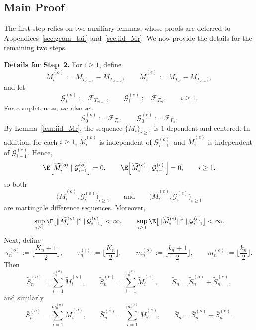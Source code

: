 \documentclass[mnsc,nonblindrev]{informs3}
\begin{document}
\subsection{Main Proof}\label{sec:proof-covariance-mismatch}

The first step relies on two auxiliary lemmas, whose proofs are deferred to
Appendices~\ref{sec:geom_tail} and~\ref{sec:iid_Mr}. We now provide the details
for the remaining two steps.

\medskip
\noindent\textbf{Details for Step~2.}
For \(i \ge 1\), define
\[
\widetilde M_i^{(o)} := M_{T_{2i-1}} - M_{T_{2i-2}},
\qquad
\widetilde M_i^{(e)} := M_{T_{2i}} - M_{T_{2i-1}},
\]
and let
\[
\mathcal G_i^{(o)} := \mathcal F_{T_{2i-1}},
\qquad
\mathcal G_i^{(e)} := \mathcal F_{T_{2i}},
\qquad i \ge 1.
\]
For completeness, we also set
\[
\mathcal G_0^{(o)} := \mathcal F_{T_0},
\qquad
\mathcal G_0^{(e)} := \mathcal F_{T_0}.
\]
By Lemma~\ref{lem:iid_Mr}, the sequence \(\{\widetilde M_i\}_{i\ge1}\) is
\(1\)-dependent and centered. In addition, for each \(i\ge1\),
\(\widetilde M_i^{(o)}\) is independent of \(\mathcal G_{i-1}^{(o)}\), and
\(\widetilde M_i^{(e)}\) is independent of \(\mathcal G_{i-1}^{(e)}\). Hence,
\[
\E\!\left[\widetilde M_i^{(o)} \mid \mathcal G_{i-1}^{(o)}\right]=0,
\qquad
\E\!\left[\widetilde M_i^{(e)} \mid \mathcal G_{i-1}^{(e)}\right]=0,
\qquad i\ge1,
\]
so both
\[
\bigl(\widetilde M_i^{(o)}, \mathcal G_i^{(o)}\bigr)_{i\ge1}
\qquad\text{and}\qquad
\bigl(\widetilde M_i^{(e)}, \mathcal G_i^{(e)}\bigr)_{i\ge1}
\]
are martingale difference sequences. Moreover,
\begin{equation}\label{eq:uniformconditional}
\sup_{i\ge1}\E\bigl[\|\widetilde M_i^{(o)}\|^p \mid \mathcal G_{i-1}^{(o)}\bigr]
< \infty,
\qquad
\sup_{i\ge1}\E\bigl[\|\widetilde M_i^{(e)}\|^p \mid \mathcal G_{i-1}^{(e)}\bigr]
< \infty.
\end{equation}
Next, define
\[
\tau_n^{(o)} := \Big\lfloor \frac{K_n+1}{2} \Big\rfloor,
\qquad
\tau_n^{(e)} := \Big\lfloor \frac{K_n}{2} \Big\rfloor,
\qquad
m_n^{(o)} := \Big\lfloor \frac{k_n+1}{2} \Big\rfloor,
\qquad
m_n^{(e)} := \Big\lfloor \frac{k_n}{2} \Big\rfloor.
\]
Then
\[
\widetilde S_n^{(o)} = \sum_{i=1}^{\tau_n^{(o)}} \widetilde M_i^{(o)},
\qquad
\widetilde S_n^{(e)} = \sum_{i=1}^{\tau_n^{(e)}} \widetilde M_i^{(e)},
\qquad
\widetilde S_n = \widetilde S_n^{(o)} + \widetilde S_n^{(e)},
\]
and similarly
\[
\bar S_n^{(o)} = \sum_{i=1}^{m_n^{(o)}} \widetilde M_i^{(o)},
\qquad
\bar S_n^{(e)} = \sum_{i=1}^{m_n^{(e)}} \widetilde M_i^{(e)},
\qquad
\bar S_n = \bar S_n^{(o)} + \bar S_n^{(e)}.
\]
\end{document}

